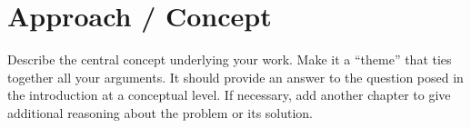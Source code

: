 \chapter{Approach / Concept}
\thispagestyle{fancy}
\label{c:approach}

Describe the central concept underlying your work. Make it a ``theme'' that ties together all your arguments. It should provide an answer to the question posed in the introduction at a conceptual level. If necessary, add another chapter to give additional reasoning about the problem or its solution.
